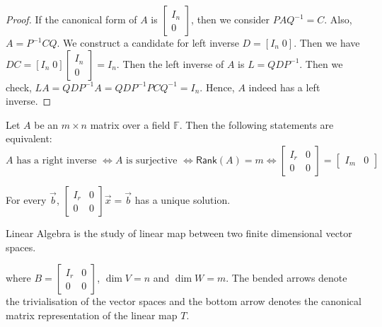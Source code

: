 \documentclass[
	11pt, %
	fleqn, %
	a4paper, %
]{LegrandOrangeBook}
\newcommand{\F}{\mathbb{F}} %
\newcommand{\rank}[1]{\mathsf{Rank}(#1)} %
\begin{document}
\begin{proof}
    If the canonical form of $A$ is $\begin{bmatrix}
        I_n \\
        0
    \end{bmatrix}$, then we consider $PAQ^{-1} = C$. Also, $A = P^{-1}CQ$. We construct a candidate for left inverse $D = [I_n \; 0]$. Then we have $DC = [I_n \; 0] \begin{bmatrix}
        I_n \\
        0
    \end{bmatrix} = I_n$. Then the left inverse of $A$ is $L = QDP^{-1}$. Then we check, $LA = QDP^{-1}A = QDP^{-1}PCQ^{-1} = I_n$. Hence, $A$ indeed has a left inverse.
\end{proof}

\begin{proposition}
    Let $A$ be an $m \times n$ matrix over a field $\F$. Then the following statements are equivalent:
    \[
        A \text{ has a right inverse } \iff A \text{ is surjective } \iff \rank{A} = m \iff \begin{bmatrix}
            I_r & 0 \\
            0 & 0
        \end{bmatrix} = \begin{bmatrix}
            I_m & 0
        \end{bmatrix}
    \]
\end{proposition}

\begin{proposition}
    For every $\vec{b}$, $\begin{bmatrix}
        I_r & 0 \\
        0 & 0
    \end{bmatrix} \vec{x} = \vec{b}$ has a unique solution.
\end{proposition}

Linear Algebra is the study of linear map between two finite dimensional vector spaces.

\begin{center}
\end{center}
where $B = \begin{bmatrix}
    I_r & 0 \\
    0 & 0
\end{bmatrix}$, $\dim V = n$ and $\dim W = m$.
The bended arrows denote the trivialisation of the vector spaces and the bottom arrow denotes the canonical matrix representation of the linear map $T$.
\end{document}
